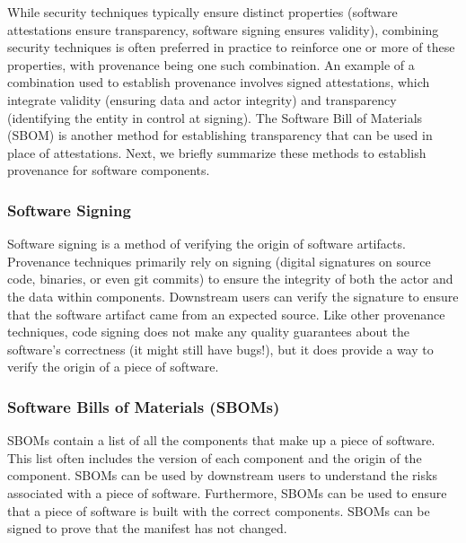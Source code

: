 \documentclass{IEEEcsmagTechrxiv}
\begin{document}
While security techniques typically ensure distinct properties (\eg software attestations ensure transparency, software signing ensures validity), combining security techniques is often preferred in practice to reinforce one or more of these properties, with provenance being one such combination.
An example of a combination used to establish provenance involves signed attestations, which integrate validity (ensuring data and actor integrity) and transparency (identifying the entity in control at signing). The Software Bill of Materials (SBOM) is another method for establishing transparency that can be used in place of attestations.
Next, we briefly summarize these methods to establish provenance for software components.

\subsubsection{Software Signing}
Software signing is a method of verifying the origin of software artifacts.
Provenance techniques primarily rely on signing (\eg digital signatures on source code, binaries, or even git commits) to ensure the integrity of both the actor and the data within components.
Downstream users can verify the signature to ensure that the software artifact came from an expected source.
Like other provenance techniques, code signing does not make any quality guarantees about the software's correctness (it might still have bugs!), but it does provide a way to verify the origin of a piece of software.


\subsubsection{Software Bills of Materials (SBOMs)}
SBOMs contain a list of all the components that make up a piece of software.
This list often includes the version of each component and the origin of the component.
SBOMs can be used by downstream users to understand the risks associated with a piece of software.
Furthermore, SBOMs can be used to ensure that a piece of software is built with the correct components.
SBOMs can be signed to prove that the manifest has not changed.
\end{document}
